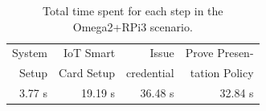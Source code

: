 \begin{table}[!ht]
	\begin{center}
		\begin{tabular}{|r|r|r|r|}
			\hline
			System & IoT Smart  & Issue  & Prove Presen-\\
			Setup & Card Setup & credential & tation Policy\\ \hline
			3.77 s & 19.19 s & 36.48 s & 32.84 s \\ \hline
		\end{tabular}
	\end{center}
	\caption{Total time spent for each step in the Omega2+RPi3 scenario.}
	\label{totaltime}
\end{table}



